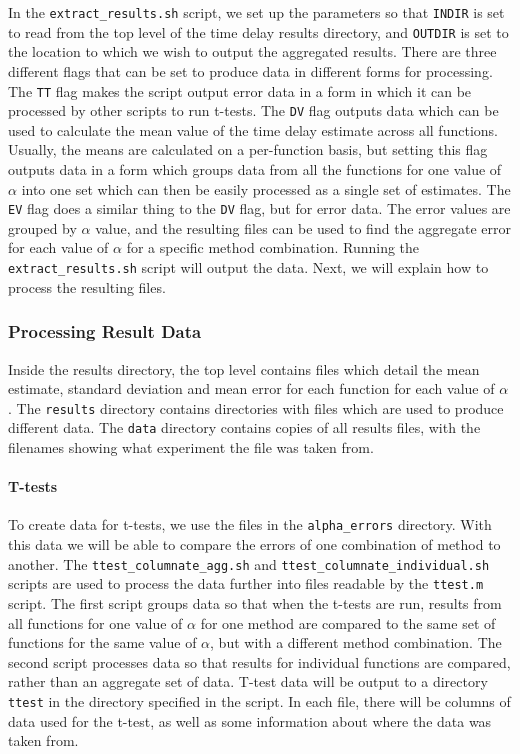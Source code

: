 \documentclass[a4paper,11pt]{article}
\begin{document}
\begin{appendices}
    In the \texttt{extract\_results.sh} script, we set up the parameters so that
    \texttt{INDIR} is set to read from the top level of the time delay results
    directory, and \texttt{OUTDIR} is set to the location to which we wish to output
    the aggregated results. There are three different flags that can be set to
    produce data in different forms for processing. The \texttt{TT} flag makes the
    script output error data in a form in which it can be processed by other scripts
    to run t-tests. The \texttt{DV} flag outputs data which can be used to calculate
    the mean value of the time delay estimate across all functions. Usually, the
    means are calculated on a per-function basis, but setting this flag outputs data
    in a form which groups data from all the functions for one value of $\alpha$
    into one set which can then be easily processed as a single set of
    estimates. The \texttt{EV} flag does a similar thing to the \texttt{DV} flag,
    but for error data. The error values are grouped by $\alpha$ value, and the
    resulting files can be used to find the aggregate error for each value of
    $\alpha$ for a specific method combination. Running the
    \texttt{extract\_results.sh} script will output the data. Next, we will explain
    how to process the resulting files.
\subsubsection{Processing Result Data}
\label{sec-10-3-7}

    Inside the results directory, the top level contains files which detail the mean
    estimate, standard deviation and mean error for each function for each value of
    $\alpha$. The \texttt{results} directory contains directories with files which
    are used to produce different data. The \texttt{data} directory contains copies
    of all results files, with the filenames showing what experiment the file was
    taken from.

    \paragraph{T-tests}

    To create data for t-tests, we use the files in the \texttt{alpha\_errors}
    directory. With this data we will be able to compare the errors of one
    combination of method to another. The \texttt{ttest\_columnate\_agg.sh} and
    \texttt{ttest\_columnate\_individual.sh} scripts are used to process the data
    further into files readable by the \texttt{ttest.m} script. The first script
    groups data so that when the t-tests are run, results from all functions for one
    value of $\alpha$ for one method are compared to the same set of functions for
    the same value of $\alpha$, but with a different method combination. The second
    script processes data so that results for individual functions are compared,
    rather than an aggregate set of data. T-test data will be output to a directory
    \texttt{ttest} in the directory specified in the script. In each file, there
    will be columns of data used for the t-test, as well as some information about
    where the data was taken from.


\end{appendices}
\end{document}
